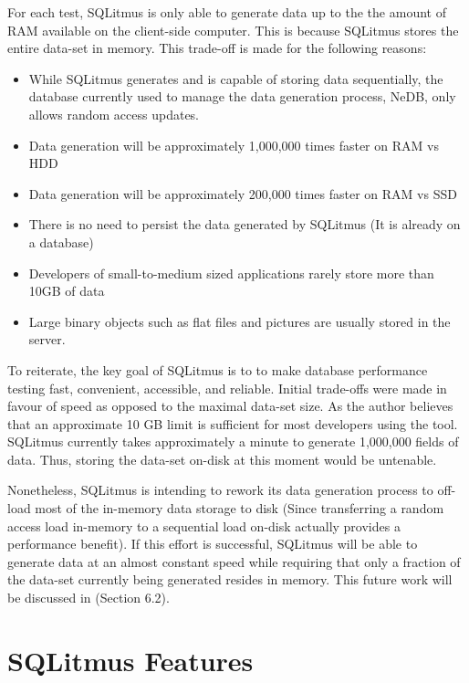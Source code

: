 \documentclass[12pt]{article}
\begin{document}
\begin{spacing}{1.9}
\begin{figure}[H]
		\end{figure}
		
		
		For each test, SQLitmus is only able to generate data up to the the amount of RAM available on the client-side computer. This is because SQLitmus stores the entire data-set in memory. This trade-off is made for the following reasons:
		\begin{itemize}
			\item While SQLitmus generates and is capable of storing data sequentially, the database currently used to manage the data generation process, NeDB, only allows random access updates. 
			\item Data generation will be approximately 1,000,000 times faster on RAM vs HDD
			\item Data generation will be approximately 200,000 times faster on RAM vs SSD
			\item There is no need to persist the data generated by SQLitmus (It is already on a database)
			\item Developers of small-to-medium sized applications rarely store more than 10GB of data
			\item Large binary objects such as flat files and pictures are usually stored in the server.
		\end{itemize}
		
		
		To reiterate, the key goal of SQLitmus is to to make database performance testing fast, convenient, accessible, and reliable. Initial trade-offs were made in favour of speed as opposed to the maximal data-set size. As the author believes that an approximate 10 GB limit is sufficient for most developers using the tool. SQLitmus currently takes approximately a minute to generate 1,000,000 fields of data. Thus, storing the data-set on-disk at this moment would be untenable.
		
		Nonetheless, SQLitmus is intending to rework its data generation process to off-load most of the in-memory data storage to disk (Since transferring a random access load in-memory to a sequential load on-disk actually provides a performance benefit). If this effort is successful, SQLitmus will be able to generate data at an almost constant speed while requiring that only a fraction of the data-set currently being generated resides in memory. This future work will be discussed in (Section 6.2).
		
		
		\section{SQLitmus Features}
		

\end{spacing}
\end{document}
